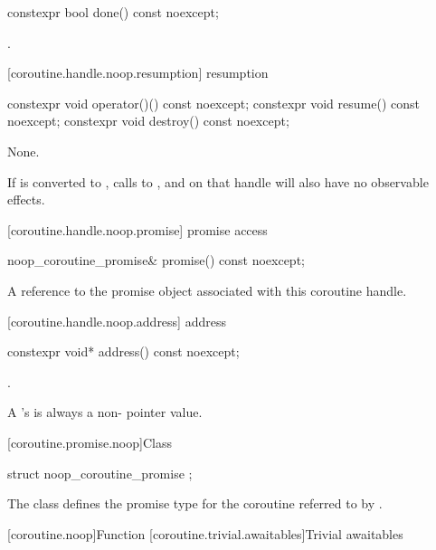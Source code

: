 \begin{itemdecl}
constexpr bool done() const noexcept; 
\end{itemdecl}

\begin{itemdescr}
\pnum \returns {}.
\end{itemdescr}

[coroutine.handle.noop.resumption]{ resumption}

\begin{itemdecl}
constexpr void operator()() const noexcept;
constexpr void resume() const noexcept;
constexpr void destroy() const noexcept;
\end{itemdecl}

\begin{itemdescr}
\pnum \effects None.

\pnum
\remarks
If  is converted to ,
calls to ,  and  on that handle
will also have no observable effects.
\end{itemdescr}

[coroutine.handle.noop.promise]{ promise access}

\begin{itemdecl}
noop_coroutine_promise& promise() const noexcept;
\end{itemdecl}

\begin{itemdescr}
\pnum \returns A reference to the promise object associated with this
coroutine handle.
\end{itemdescr}

[coroutine.handle.noop.address]{ address}

\begin{itemdecl}
constexpr void* address() const noexcept;
\end{itemdecl}

\begin{itemdescr}
\pnum \returns {}.

\pnum \remarks A 's  is always a
non- pointer value.
\end{itemdescr}

[coroutine.promise.noop]{Class }

\begin{itemdecl}
struct noop_coroutine_promise {};
\end{itemdecl}

\begin{itemdescr}
\pnum The class  defines the promise type for
the coroutine referred to
by .
\end{itemdescr}

[coroutine.noop]{Function }
[coroutine.trivial.awaitables]{Trivial awaitables}
